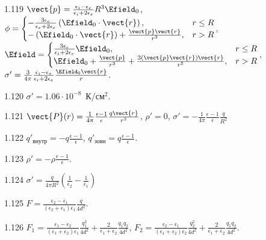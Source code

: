 \begin{Solution}{1.{119}}
	$\vect{p} = \frac{\epsilon_i - \epsilon_e}{\epsilon_i + 2\epsilon_e}R^3\Efield_0$,
	$
		\phi =
		\begin{cases}
			-\frac{3\epsilon_e}{\epsilon_e + 2\epsilon_e}\left( \Efield_0\cdot \vect{r}\right), & r \le R \\
			-\left( \Efield_0\cdot \vect{r}\right) + \frac{\vect{p} \vect{r}}{r^3},             & r > R
		\end{cases}
	$,\\
	$
		\Efield =
		\begin{cases}
			\frac{3\epsilon_e}{\epsilon_i + 2\epsilon_e} \Efield_0,                                 & r \le R \\
			\Efield_0 + \frac{\vect{p}}{r^3} + \frac{3\left(\vect{p}\vect{r}\right)\vect{r} }{r^5}, & r > R
		\end{cases}
	$,
	$\sigma' = \frac{3}{4\pi} \frac{\epsilon_i - \epsilon_e}{\epsilon_i + 2\epsilon_e} \frac{\Efield_0\vect{r}}{r}$.
\end{Solution}
\begin{Solution}{1.{120}}
	$\sigma' = 1.06\cdot10^{-8}$~К/см$^2$.
\end{Solution}
\begin{Solution}{1.{121}}
	$\vect{P}(r) = \frac{1}{4\pi}\frac{\epsilon -1 }{\epsilon}\frac{q\vect{r}}{r^3}$,
	$\rho'=0$,
	$\sigma'=  - \frac{1}{4\pi}\frac{\epsilon -1 }{\epsilon}\frac{q}{R^2}$
\end{Solution}
\begin{Solution}{1.{122}}
		$q'_\text{внутр} = -q\frac{\epsilon - 1}{\epsilon}$, 	$q'_\text{зовн} = q\frac{\epsilon - 1}{\epsilon}$.
	
\end{Solution}
\begin{Solution}{1.{123}}
		$\rho' = -\rho \frac{\epsilon - 1}{\epsilon}$.
	
\end{Solution}
\begin{Solution}{1.{124}}
	$\sigma' = \frac{q}{4\pi R^2}\left( \frac{1}{\epsilon_2} - \frac{1}{\epsilon_1} \right) $
\end{Solution}
\begin{Solution}{1.{125}}
	$F = \frac{\epsilon_2 - \epsilon_1}{(\epsilon_2 + \epsilon_1)\epsilon_1} \frac{q}{4d^2}$.
\end{Solution}
\begin{Solution}{1.{126}}
	$F_1 = \frac{\epsilon_1 - \epsilon_2}{(\epsilon_1 + \epsilon_2)\epsilon_1} \frac{q_1^2}{4d^2} + \frac{2}{\epsilon_1 + \epsilon_2} \frac{q_1q_2}{4d^2}$,
	$F_2 = \frac{\epsilon_2 - \epsilon_1}{(\epsilon_1 + \epsilon_2)\epsilon_2} \frac{q_2^2}{4d^2} + \frac{2}{\epsilon_1 + \epsilon_2} \frac{q_1q_2}{4d^2}$.	
\end{Solution}
